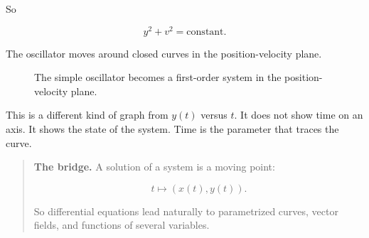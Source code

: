So

\[
y^2+v^2=\text{constant}.
\]

The oscillator moves around closed curves in the position-velocity plane.

\begin{figure}[h]
\centering
{}
\caption{The simple oscillator becomes a first-order system in the position-velocity plane.}
\label{fig:oscillator-phase-plane}
\end{figure}

This is a different kind of graph from \(y(t)\) versus \(t\).  It does not show time on an
axis.  It shows the state of the system.  Time is the parameter that traces the curve.

\begin{quote}
\textbf{The bridge.}
A solution of a system is a moving point:

\[
t\longmapsto (x(t),y(t)).
\]

So differential equations lead naturally to parametrized curves, vector fields, and
functions of several variables.
\end{quote}

